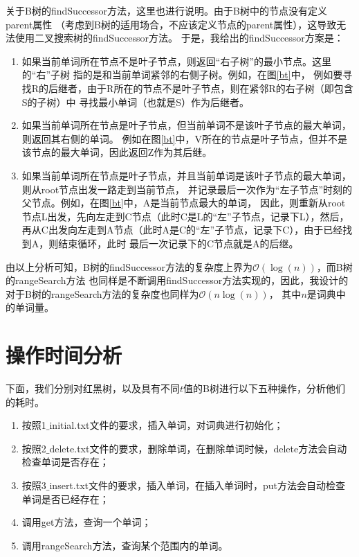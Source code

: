 \documentclass{article}
\begin{document}
关于B树的findSuccessor方法，这里也进行说明。由于B树中的节点没有定义parent属性
（考虑到B树的适用场合，不应该定义节点的parent属性），这导致无法使用二叉搜索树的findSuccessor方法。
于是，我给出的findSuccessor方案是：
\begin{enumerate}
	\item 如果当前单词所在节点不是叶子节点，则返回“右子树”的最小节点。这里的“右”子树
			指的是和当前单词紧邻的右侧子树。例如，在图\ref{bt}中，
			例如要寻找R的后继者，由于R所在的节点不是叶子节点，则在紧邻R的右子树（即包含S的子树）中
			寻找最小单词（也就是S）作为后继者。
	\item 如果当前单词所在节点是叶子节点，但当前单词不是该叶子节点的最大单词，则返回其右侧的单词。
			例如在图\ref{bt}中，V所在的节点是叶子节点，但并不是该节点的最大单词，因此返回Z作为其后继。
	\item 如果当前单词所在节点是叶子节点，并且当前单词是该叶子节点的最大单词，则从root节点出发一路走到当前节点，
			并记录最后一次作为“左子节点”时刻的父节点。例如，在图\ref{bt}中，A是当前节点最大的单词，
			因此，则重新从root节点L出发，先向左走到C节点（此时C是L的“左”子节点，记录下L），然后，
			再从C出发向左走到A节点（此时A是C的“左”子节点，记录下C），由于已经找到A，则结束循环，此时
			最后一次记录下的C节点就是A的后继。
\end{enumerate}

由以上分析可知，B树的findSuccessor方法的复杂度上界为$\mathcal{O} (\log(n))$，而B树的rangeSearch方法
也同样是不断调用findSuccessor方法实现的，因此，我设计的对于B树的rangeSearch方法的复杂度也同样为$\mathcal{O} (n\log(n))$，
其中$n$是词典中的单词量。

\section{操作时间分析}
下面，我们分别对红黑树，以及具有不同$t$值的B树进行以下五种操作，分析他们的耗时。
\begin{enumerate}
	\item 按照1$\_$initial.txt文件的要求，插入单词，对词典进行初始化；
	\item 按照2$\_$delete.txt文件的要求，删除单词，在删除单词时候，delete方法会自动检查单词是否存在；
	\item 按照3$\_$insert.txt文件的要求，插入单词，在插入单词时，put方法会自动检查单词是否已经存在；
	\item 调用get方法，查询一个单词；
	\item 调用rangeSearch方法，查询某个范围内的单词。
\end{enumerate}
\end{document}
